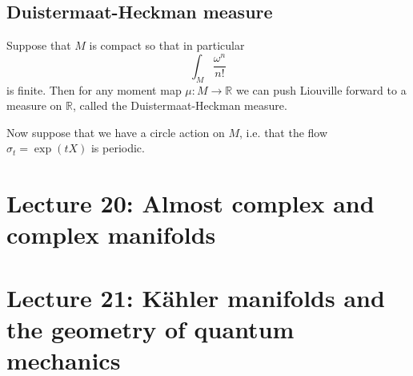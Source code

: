 \documentclass[11pt]{article} %
\begin{document}
\subsection*{Duistermaat-Heckman measure}
Suppose that $M$ is compact so that in particular 
$$
\int_M \frac{\omega^n}{n!} 
$$
is finite. Then for any moment map $\mu:M \rightarrow \mathbb{R}$ we can push Liouville forward to a measure on $\mathbb{R}$, called the Duistermaat-Heckman measure. 

Now suppose that we have a circle action on $M$, i.e. that the flow $\sigma_t = \operatorname{exp}(tX)$ is periodic. 


\section*{Lecture 20: Almost complex and complex manifolds}

\section*{Lecture 21: Kähler manifolds and the geometry of quantum mechanics}
\end{document}

